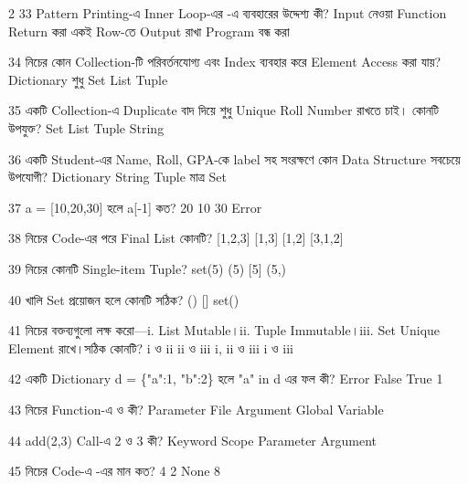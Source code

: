 \begin{multicols}{2}
\mcq
{33}
{Pattern Printing-এ Inner Loop-এর -এ  ব্যবহারের উদ্দেশ্য কী?}
{Input নেওয়া}
{Function Return করা}
{একই Row-তে Output রাখা}
{Program বন্ধ করা}

\mcq
{34}
{নিচের কোন Collection-টি পরিবর্তনযোগ্য এবং Index ব্যবহার করে Element Access করা যায়?}
{Dictionary শুধু}
{Set}
{List}
{Tuple}

\mcq
{35}
{একটি Collection-এ Duplicate বাদ দিয়ে শুধু Unique Roll Number রাখতে চাই। কোনটি উপযুক্ত?}
{Set}
{List}
{Tuple}
{String}

\mcq
{36}
{একটি Student-এর Name, Roll, GPA-কে label সহ সংরক্ষণে কোন Data Structure সবচেয়ে উপযোগী?}
{Dictionary}
{String}
{Tuple মাত্র}
{Set}

\mcqwide
{37}
{\textenglish{\ttfamily a = [10,20,30]} হলে \textenglish{\ttfamily a[-1]} কত?}
{20}
{10}
{30}
{Error}

\mcqwide
{38}
{নিচের Code-এর পরে Final List কোনটি?}
{[1,2,3]}
{[1,3]}
{[1,2]}
{[3,1,2]}

\mcq
{39}
{নিচের কোনটি Single-item Tuple?}
{set(5)}
{(5)}
{[5]}
{(5,)}

\mcq
{40}
{খালি Set প্রয়োজন হলে কোনটি সঠিক?}
{()}
{[]}
{set()}
{{}}

\mcqwide
{41}
{নিচের বক্তব্যগুলো লক্ষ করো—\newline i. List Mutable।\newline ii. Tuple Immutable।\newline iii. Set Unique Element রাখে।\newline সঠিক কোনটি?}
{i ও ii}
{ii ও iii}
{i, ii ও iii}
{i ও iii}

\mcqwide
{42}
{একটি Dictionary \textenglish{\ttfamily d = \{"a":1, "b":2\}} হলে \textenglish{\ttfamily "a" in d} এর ফল কী?}
{Error}
{False}
{True}
{1}

\mcqwide
{43}
{নিচের Function-এ  ও  কী?}
{Parameter}
{File}
{Argument}
{Global Variable}

\mcqwide
{44}
{\textenglish{\ttfamily add(2,3)} Call-এ 2 ও 3 কী?}
{Keyword}
{Scope}
{Parameter}
{Argument}

\mcqwide
{45}
{নিচের Code-এ -এর মান কত?}
{4}
{2}
{None}
{8}


\end{multicols}
